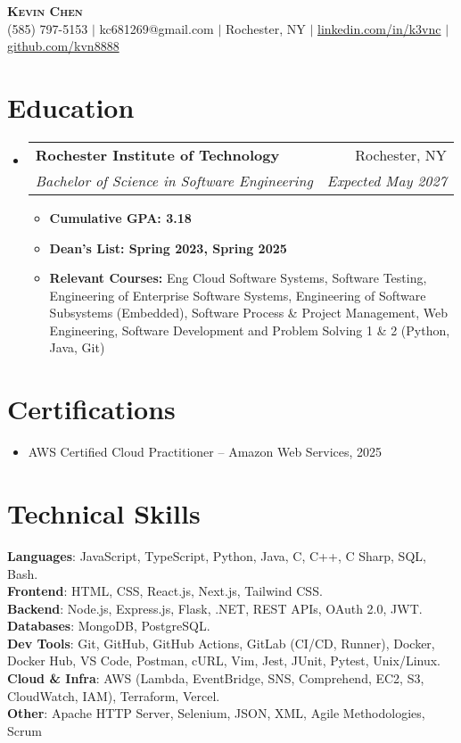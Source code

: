 \documentclass[letterpaper,11pt]{article}
\makeatletter
\newcommand{\resumeItem}[1]{
  \item\small{
    {#1 \vspace{-2pt}}
  }
}
\newcommand{\resumeSubheading}[4]{
  \vspace{-2pt}\item
    \begin{tabular*}{0.97\textwidth}[t]{l@{\extracolsep{\fill}}r}
      \textbf{#1} & #2 \\
      \textit{\small#3} & \textit{\small #4} \\
    \end{tabular*}\vspace{-7pt}
}
\newcommand{\resumeSubHeadingListStart}{\begin{itemize}[leftmargin=0.15in, label={}]}\newcommand{\resumeSubHeadingListEnd}{\end{itemize}}
\newcommand{\resumeItemListStart}{\begin{itemize}}
\newcommand{\resumeItemListEnd}{\end{itemize}\vspace{-5pt}}
\makeatother
\begin{document}
\begin{center}
    \textbf{\Huge \scshape Kevin Chen} \\ \vspace{1pt}
    \small (585) 797-5153 $|$ kc681269@gmail.com $|$ Rochester, NY $|$ 
    \href{https://www.linkedin.com/in/k3vnc/}{linkedin.com/in/k3vnc} $|$ 
    \href{https://github.com/kvn8888}{github.com/kvn8888}
\end{center}

\section{Education}
  \resumeSubHeadingListStart
    \resumeSubheading
      {Rochester Institute of Technology}{Rochester, NY}
      {Bachelor of Science in Software Engineering}{Expected May 2027}
      \resumeItemListStart
        \resumeItem{\textbf{Cumulative GPA: 3.18}}
        \resumeItem{\textbf{Dean's List: Spring 2023, Spring 2025}}
        \resumeItem{\textbf{Relevant Courses:} Eng Cloud Software Systems, Software Testing, Engineering of Enterprise Software Systems, Engineering of Software Subsystems (Embedded), Software Process \& Project Management, Web Engineering, Software Development and Problem Solving 1 \& 2 (Python, Java, Git)}
      \resumeItemListEnd
  \resumeSubHeadingListEnd

\section{Certifications}
  \resumeSubHeadingListStart
    \resumeItem{AWS Certified Cloud Practitioner -- Amazon Web Services, 2025}
  \resumeSubHeadingListEnd

\section{Technical Skills}
\begin{itemize}[leftmargin=0.15in, label={}]
\small{\item{
\textbf{Languages}{: JavaScript, TypeScript, Python, Java, C, C++, C Sharp, SQL, Bash.} \\
\textbf{Frontend}{: HTML, CSS, React.js, Next.js, Tailwind CSS.} \\
\textbf{Backend}{: Node.js, Express.js, Flask, .NET, REST APIs, OAuth 2.0, JWT.} \\
\textbf{Databases}{: MongoDB, PostgreSQL.} \\
\textbf{Dev Tools}{: Git, GitHub, GitHub Actions, GitLab (CI/CD, Runner), Docker, Docker Hub, VS Code, Postman, cURL, Vim, Jest, JUnit, Pytest, Unix/Linux.} \\
\textbf{Cloud \& Infra}{: AWS (Lambda, EventBridge, SNS, Comprehend, EC2, S3, CloudWatch, IAM), Terraform, Vercel.} \\
\textbf{Other}{: Apache HTTP Server, Selenium, JSON, XML, Agile Methodologies, Scrum}}}
\end{itemize}
\end{document}
